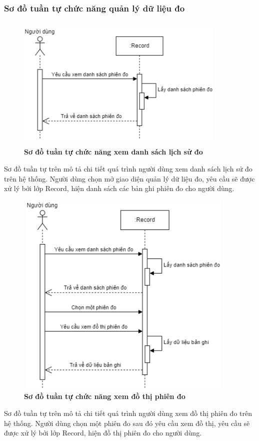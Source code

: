 \subsubsection{Sơ đồ tuần tự chức năng quản lý dữ liệu đo}
\begin{figure}[H]
  \centering
  \includegraphics[width=10cm,height=6.5cm]{Images/sequence/sequence_manage_record.png}
  \caption[Sơ đồ tuần tự chức năng xem danh sách lịch sử đo]{\bfseries \fontsize{12pt}{0pt}
  \selectfont Sơ đồ tuần tự chức năng xem danh sách lịch sử đo}
  \label{sequence_manage_record} %
\end{figure}
Sơ đồ tuần tự trên mô tả chi tiết quá trình người dùng xem danh sách lịch sử đo trên hệ thống. Người dùng chọn mở giao diện quản lý dữ liệu đo, 
yêu cầu sẽ được xử lý bởi lớp Record, hiện danh sách các bản ghi phiên đo cho người dùng.

\begin{figure}[H]
  \centering
  \includegraphics[width=10.5cm,height=10cm]{Images/sequence/sequence_manage_chart_record.png}
  \caption[Sơ đồ tuần tự chức năng xem đồ thị phiên đo]{\bfseries \fontsize{12pt}{0pt}
  \selectfont Sơ đồ tuần tự chức năng xem đồ thị phiên đo}
  \label{sequence_manage_chart_record} %
\end{figure}
Sơ đồ tuần tự trên mô tả chi tiết quá trình người dùng xem đồ thị phiên đo trên hệ thống. Người dùng chọn một phiên đo sau đó yêu cầu xem đồ thị, 
yêu cầu sẽ được xử lý bởi lớp Record, hiện đồ thị phiên đo cho người dùng.

